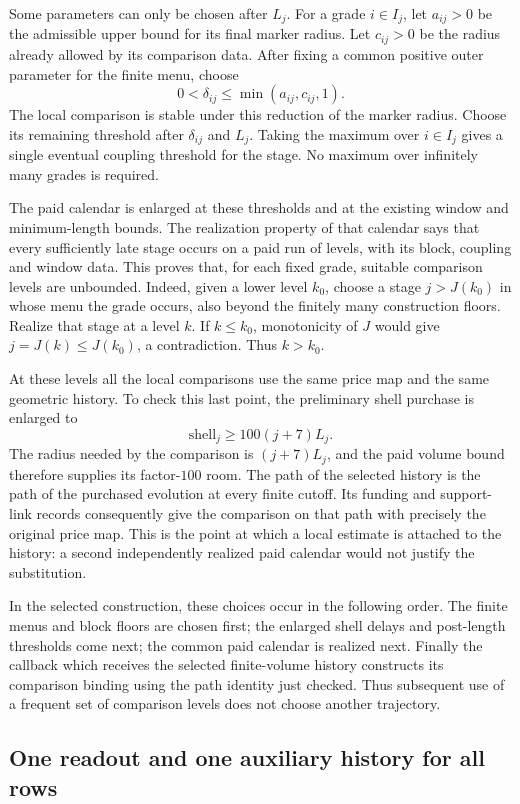 Some parameters can only be chosen after $L_j$. For a grade $i\in I_j$,
let $a_{ij}>0$ be the admissible upper bound for its final marker radius.
Let $c_{ij}>0$ be the radius already allowed by its comparison data.
After fixing a common positive outer parameter for the finite menu, choose
\[
             0<\delta_{ij}\le\min(a_{ij},c_{ij},1).
\]
The local comparison is stable under this reduction of the marker radius.
Choose its remaining threshold after $\delta_{ij}$ and $L_j$. Taking the
maximum over $i\in I_j$ gives a single eventual coupling threshold for
the stage. No maximum over infinitely many grades is required.

The paid calendar is enlarged at these thresholds and at the existing
window and minimum-length bounds. The realization property of that
calendar says that every sufficiently late stage occurs on a paid run
of levels, with its block, coupling and window data. This proves that,
for each fixed grade, suitable comparison levels are unbounded. Indeed,
given a lower level $k_0$, choose a stage $j>J(k_0)$ in whose menu the
grade occurs, also beyond the finitely many construction floors. Realize
that stage at a level $k$. If $k\le k_0$, monotonicity of $J$ would give
$j=J(k)\le J(k_0)$, a contradiction. Thus $k>k_0$.

At these levels all the local comparisons use the same price map and
the same geometric history. To check this last point, the preliminary
shell purchase is enlarged to
\[
                     \text{shell}_j\ge100(j+7)L_j.
\]
The radius needed by the comparison is $(j+7)L_j$, and the paid volume
bound therefore supplies its factor-$100$ room. The path of the selected
history is the path of the purchased evolution at every finite cutoff.
Its funding and support-link records consequently give the comparison
on that path with precisely the original price map. This is the point
at which a local estimate is attached to the history: a second
independently realized paid calendar would not justify the substitution.

In the selected construction, these choices occur in the following
order. The finite menus and block floors are chosen first; the enlarged
shell delays and post-length thresholds come next; the common paid
calendar is realized next. Finally the callback which receives the
selected finite-volume history constructs its comparison binding using
the path identity just checked. Thus subsequent use of a frequent set
of comparison levels does not choose another trajectory.

\subsection{One readout and one auxiliary history for all rows}

